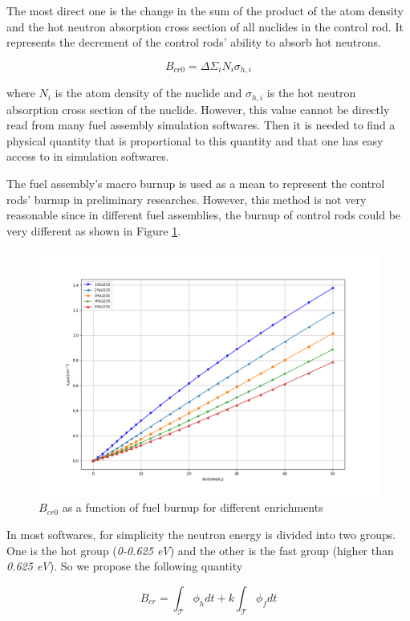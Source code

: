 The most direct one is the change in the sum of the product of the atom density
and the hot neutron absorption cross section of all nuclides in the control rod.
It represents the decrement of the control rods' ability to absorb hot neutrons.

\begin{equation}
    \label{eq:bcr0}
    B_{cr0} = \Delta \Sigma_i N_i \sigma_{h,i}
\end{equation}

where $N_i$ is the atom density of the nuclide and
$\sigma_{h,i}$ is the hot neutron absorption cross section of the nuclide.
However, this value cannot be directly read from many fuel assembly simulation softwares.
Then it is needed to find a physical quantity that is proportional to this quantity and
that one has easy access to in simulation softwares.

The fuel assembly's macro burnup is used as a mean to represent
the control rods' burnup in preliminary researches.
However, this method is not very reasonable since in different fuel assemblies,
the burnup of control rods could be very different as shown in Figure \ref{fig:bcr0-bu}.

\begin{figure}[!htb]
    \centering\includegraphics[width=0.6\linewidth]{Figs/Bcr0_Bu_difU.png}
    \caption{$B_{cr0}$ as a function of fuel burnup for different enrichments}
    \label{fig:bcr0-bu}
\end{figure}


In most softwares, for simplicity the neutron energy is divided into two groups.
One is the hot group (\textit{0-0.625 eV}) and the other is the fast group (higher than \textit{0.625 eV}).
So we propose the following quantity

\begin{equation}
    \label{eq:bcr}
    B_{cr} = \int_{\mathcal{T}}\phi_hdt + k\int_{\mathcal{T}}\phi_fdt
\end{equation}

